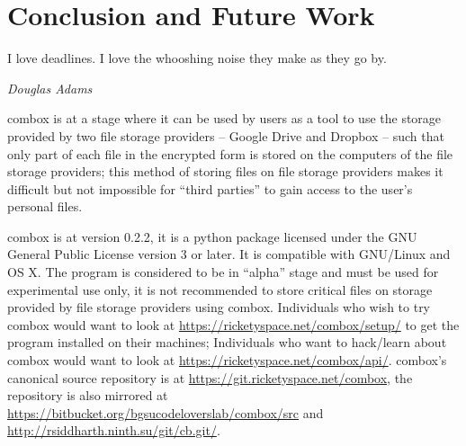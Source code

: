 \chapter{Conclusion and Future Work}\label{ch:5}

\epigraph{I love deadlines. I love the whooshing noise they make as
  they go by.}{\textit{Douglas Adams}}

combox is at a stage where it can be used by users as a tool to use
the storage provided by two file storage providers -- Google Drive and
Dropbox -- such that only part of each file in the encrypted form is
stored on the computers of the file storage providers; this method of
storing files on file storage providers makes it difficult but not
impossible for ``third parties'' to gain access to the user's personal
files.

combox is at version 0.2.2, it is a python package licensed under the
GNU General Public License version 3 or later. It is compatible with
GNU/Linux and OS X. The program is considered to be in ``alpha'' stage
and must be used for experimental use only, it is not recommended to
store critical files on storage provided by file storage providers
using combox. Individuals who wish to try combox would want to look at
\url{https://ricketyspace.net/combox/setup/} to get the program
installed on their machines; Individuals who want to hack/learn about
combox would want to look at
\url{https://ricketyspace.net/combox/api/}. combox's canonical source
repository is at \url{https://git.ricketyspace.net/combox}, the
repository is also mirrored at
\url{https://bitbucket.org/bgsucodeloverslab/combox/src} and
\url{http://rsiddharth.ninth.su/git/cb.git/}.

